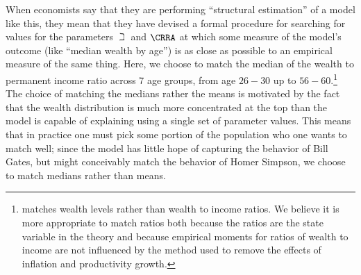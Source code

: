 \documentclass[titlepage, headings=optiontotocandhead]{\econtex}
\begin{document}
When economists say that they are performing ``structural estimation''
of a model like this, they mean that they have devised a
formal procedure for searching for values for the parameters ${\beth}$
and $\CRRA$ at which some measure of the model's outcome (like
``median wealth by age'') is as close as possible to an empirical measure
of the same thing. Here, we choose to match the median of the
wealth to permanent income ratio across 7 age groups, from age $26-30$
up to $56-60$.\footnote{\cite{cagettiWprofiles}
  matches wealth levels rather than wealth to income ratios. We
  believe it is more appropriate to match ratios both because the
  ratios are the state variable in the theory and because empirical
  moments for ratios of wealth to income are not influenced by the
  method used to remove the effects of inflation and productivity
  growth.} The choice of matching the medians rather the means is
motivated by the fact that the wealth distribution is much more
concentrated at the top than the model is capable of explaining using a single
set of parameter values.  This means that in practice one must pick
some portion of the population who one wants to match well; since the
model has little hope of capturing the behavior of Bill Gates, but
might conceivably match the behavior of Homer Simpson, we choose to
match medians rather than means.
\end{document}
